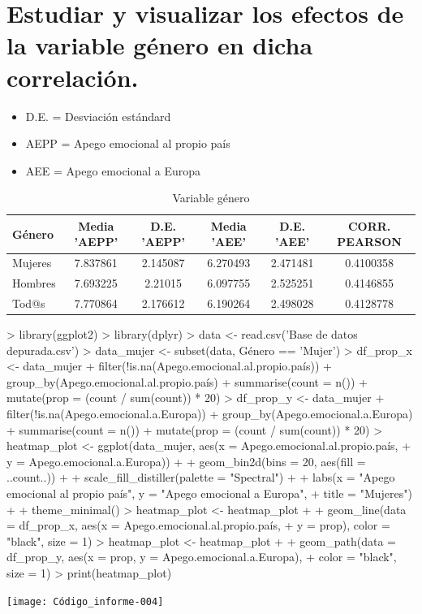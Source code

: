 \documentclass{article}
\begin{document}
\section{Estudiar y visualizar los efectos de la variable género en dicha correlación.}
 \begin{itemize}
 \item D.E. = Desviación estándard
 \item AEPP = Apego emocional al propio país
 \item AEE = Apego emocional a Europa
 \end{itemize}
 \begin{table}[h!]
 \caption{Variable género}
 \begin{tabular}{l | c c c c c}
 \hline
 \bf{Género} & \bf{Media 'AEPP'} & \bf{D.E. 'AEPP'} & \bf{Media 'AEE'} & \bf{D.E. 'AEE'} & \bf{CORR. PEARSON} \\
 \hline
 Mujeres & 7.837861 & 2.145087 & 6.270493 & 2.471481 & 0.4100358 \\
 Hombres & 7.693225 & 2.21015 & 6.097755 & 2.525251 & 0.4146855 \\
 Tod@s & 7.770864 & 2.176612 & 6.190264 & 2.498028 & 0.4128778 \\
 \hline
 \end{tabular}
 \end{table}

\begin{Schunk}
\begin{Sinput}
> library(ggplot2)
> library(dplyr)
> data <- read.csv('Base de datos depurada.csv')
> data_mujer <- subset(data, Género == 'Mujer')
> df_prop_x <- data_mujer %
+   filter(!is.na(Apego.emocional.al.propio.país)) %
+   group_by(Apego.emocional.al.propio.país) %
+   summarise(count = n()) %
+   mutate(prop = (count / sum(count)) * 20)
> df_prop_y <- data_mujer %
+   filter(!is.na(Apego.emocional.a.Europa)) %
+   group_by(Apego.emocional.a.Europa) %
+   summarise(count = n()) %
+   mutate(prop = (count / sum(count)) * 20)
> heatmap_plot <- ggplot(data_mujer, aes(x = Apego.emocional.al.propio.país,
+                                  y = Apego.emocional.a.Europa)) +
+   geom_bin2d(bins = 20, aes(fill = ..count..)) +
+   scale_fill_distiller(palette = "Spectral") +
+   labs(x = "Apego emocional al propio país", y = "Apego emocional a Europa",
+        title = "Mujeres") +
+   theme_minimal()
> heatmap_plot <- heatmap_plot +
+   geom_line(data = df_prop_x, aes(x = Apego.emocional.al.propio.país,
+                                   y = prop), color = "black", size = 1)
> heatmap_plot <- heatmap_plot +
+   geom_path(data = df_prop_y, aes(x = prop, y = Apego.emocional.a.Europa),
+             color = "black", size = 1)
> print(heatmap_plot)
\end{Sinput}
\end{Schunk}
\texttt{[image: Código\_informe-004]}
\end{document}
